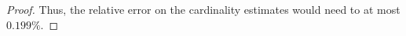 \documentclass{article}
\begin{document}
\begin{enumerate}
\begin{proof}
        Thus, the relative error on the cardinality estimates would need to at most $0.199\%$.

    \end{proof}
\end{enumerate}
\end{document}
